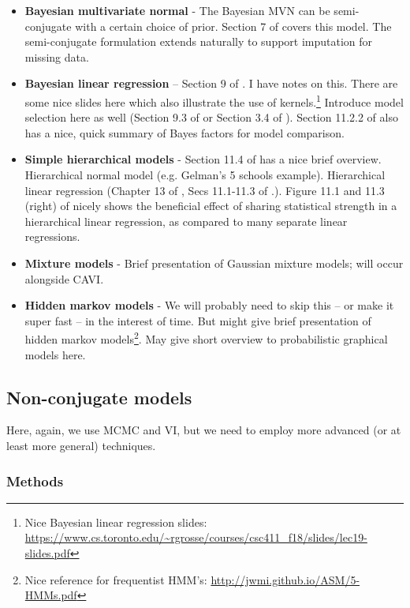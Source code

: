 \documentclass{article} %
\begin{document}
\begin{itemize}
	\item \textbf{Bayesian multivariate normal} -  The Bayesian MVN can be semi-conjugate with a certain choice of prior. Section 7 of \cite{hoff2009first} covers this model.  The semi-conjugate formulation extends naturally to support imputation for missing data.  
\item \textbf{Bayesian linear regression} -- Section 9 of \cite{hoff2009first}.     I have notes on this.   There are some nice slides here which also illustrate the use of kernels.\footnote{Nice Bayesian linear regression slides: \url{https://www.cs.toronto.edu/~rgrosse/courses/csc411_f18/slides/lec19-slides.pdf}}   Introduce model selection here as well (Section 9.3 of \cite{hoff2009first} or Section 3.4 of \cite{bishop2006pattern}).   Section 11.2.2 of \cite{davison2003statistical} also has a nice,  quick summary of Bayes factors for model comparison.   
\item \textbf{Simple hierarchical models} - Section 11.4 of \cite{davison2003statistical} has a nice brief overview.    Hierarchical normal model (e.g. Gelman's 5 schools example).   Hierarchical linear regression (Chapter 13 of \cite{gelman2013bayesian},   Secs 11.1-11.3 of \cite{hoff2009first}.).  Figure 11.1 and 11.3 (right) of \cite{hoff2009first} nicely shows the beneficial effect of sharing statistical strength in a hierarchical linear regression,  as compared to many separate linear regressions.  
\item \textbf{Mixture models} - Brief presentation of Gaussian mixture models; will occur alongside CAVI.
\item \textbf{Hidden markov models} -   We will probably need to skip this -- or make it super fast -- in the interest of time.   But might give brief presentation of hidden markov models\footnote{Nice reference for frequentist HMM's: \url{http://jwmi.github.io/ASM/5-HMMs.pdf}}. May give short overview to probabilistic graphical models here.
\end{itemize}

\subsection{Non-conjugate models} \label{sec:non_conjugacy}

Here, again, we use MCMC and VI, but we need to employ more advanced (or at least more general) techniques.

\subsubsection{Methods}
\end{document}
